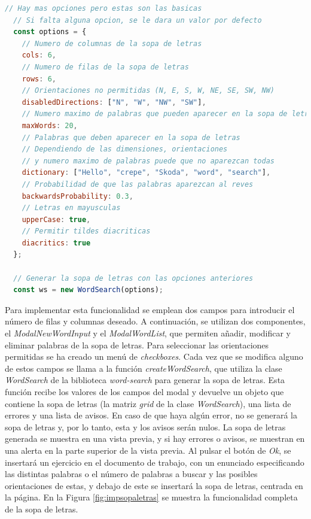 \begin{lstlisting}[label=fig:impsopaletrasopciones, caption=Opciones para la sopa de letras., language=JavaScript, float]
  // Hay mas opciones pero estas son las basicas
  // Si falta alguna opcion, se le dara un valor por defecto
  const options = {
    // Numero de columnas de la sopa de letras
    cols: 6,
    // Numero de filas de la sopa de letras
    rows: 6,
    // Orientaciones no permitidas (N, E, S, W, NE, SE, SW, NW)
    disabledDirections: ["N", "W", "NW", "SW"],
    // Numero maximo de palabras que pueden aparecer en la sopa de letras
    maxWords: 20,
    // Palabras que deben aparecer en la sopa de letras
    // Dependiendo de las dimensiones, orientaciones
    // y numero maximo de palabras puede que no aparezcan todas
    dictionary: ["Hello", "crepe", "Skoda", "word", "search"],
    // Probabilidad de que las palabras aparezcan al reves
    backwardsProbability: 0.3,
    // Letras en mayusculas
    upperCase: true,
    // Permitir tildes diacriticas
    diacritics: true
  };

  // Generar la sopa de letras con las opciones anteriores
  const ws = new WordSearch(options);
\end{lstlisting}

Para implementar esta funcionalidad se emplean dos campos para introducir el número de filas y columnas deseado. A continuación, se utilizan dos componentes, el \textit{ModalNewWordInput} y el \textit{ModalWordList}, que permiten añadir, modificar y eliminar palabras de la sopa de letras. Para seleccionar las orientaciones permitidas se ha creado un menú de \textit{checkboxes}. Cada vez que se modifica alguno de estos campos se llama a la función \textit{createWordSearch}, que utiliza la clase \textit{WordSearch} de la biblioteca \textit{word-search} para generar la sopa de letras. Esta función recibe los valores de los campos del modal y devuelve un objeto que contiene la sopa de letras (la matriz \textit{grid} de la clase \textit{WordSearch}), una lista de errores y una lista de avisos. En caso de que haya algún error, no se generará la sopa de letras y, por lo tanto, esta y los avisos serán nulos. La sopa de letras generada se muestra en una vista previa, y si hay errores o avisos, se muestran en una alerta en la parte superior de la vista previa. Al pulsar el botón de \textit{Ok}, se insertará un ejercicio en el documento de trabajo, con un enunciado especificando las distintas palabras o el número de palabras a buscar y las posibles orientaciones de estas, y debajo de este se insertará la sopa de letras, centrada en la página. En la Figura \ref{fig:impsopaletras} se muestra la funcionalidad completa de la sopa de letras.

